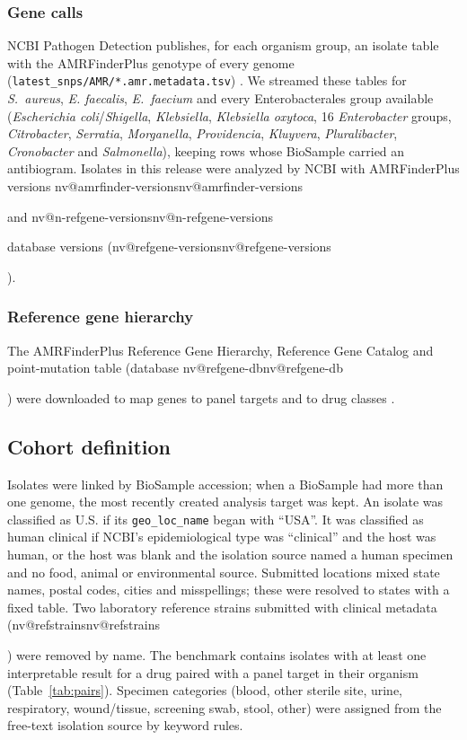 \documentclass[10pt,twocolumn,letterpaper]{article}
\makeatletter
\newcommand{\nv}[1]{\ifcsname nv@#1\endcsname\csname nv@#1\endcsname\else
  \PackageError{numbers}{Unknown number key: #1}{Run build_assets.py}\fi}
\newcommand{\sau}{\textit{S.~aureus}}
\makeatother
\begin{document}
\subsubsection{Gene calls}
NCBI Pathogen Detection publishes, for each organism group, an isolate table with the AMRFinderPlus genotype of every
genome (\texttt{latest\_snps/AMR/*.amr.metadata.tsv}) \cite{ncbipd}. We streamed these tables for \sau{}, \textit{E.
faecalis}, \textit{E.~faecium} and every Enterobacterales group available (\textit{Escherichia coli}/\textit{Shigella},
\textit{Klebsiella}, \textit{Klebsiella oxytoca}, 16 \textit{Enterobacter} groups, \textit{Citrobacter}, \textit{Serratia},
\textit{Morganella}, \textit{Providencia}, \textit{Kluyvera}, \textit{Pluralibacter}, \textit{Cronobacter} and
\textit{Salmonella}), keeping rows whose BioSample carried an antibiogram. Isolates in this release were analyzed by NCBI
with AMRFinderPlus versions \nv{amrfinder-versions} and \nv{n-refgene-versions} database versions (\nv{refgene-versions}).

\subsubsection{Reference gene hierarchy}
The AMRFinderPlus Reference Gene Hierarchy, Reference Gene Catalog and point-mutation table (database \nv{refgene-db})
were downloaded to map genes to panel targets and to drug classes \cite{feldgarden2021}.

\subsection{Cohort definition}

Isolates were linked by BioSample accession; when a BioSample had more than one genome, the most recently created analysis
target was kept. An isolate was classified as U.S. if its \texttt{geo\_loc\_name} began with ``USA''. It was classified as
human clinical if NCBI's epidemiological type was ``clinical'' and the host was human, or the host was blank and the
isolation source named a human specimen and no food, animal or environmental source. Submitted locations mixed state names,
postal codes, cities and misspellings; these were resolved to states with a fixed table. Two laboratory reference strains
submitted with clinical metadata (\nv{refstrains}) were removed by name. The benchmark contains isolates with at least one
interpretable result for a drug paired with a panel target in their organism (Table~\ref{tab:pairs}). Specimen categories
(blood, other sterile site, urine, respiratory, wound/tissue, screening swab, stool, other) were assigned from the
free-text isolation source by keyword rules.
\end{document}
